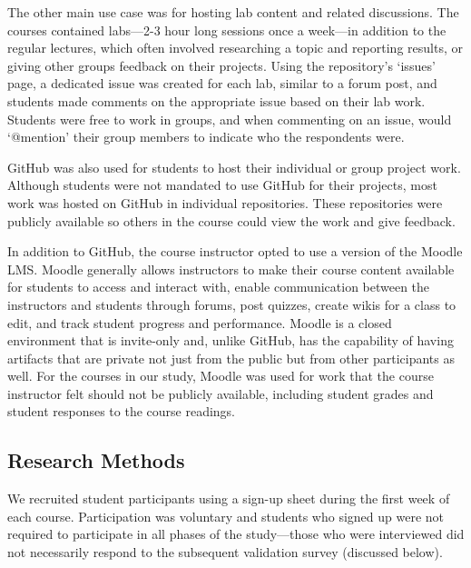The other main use case was for hosting lab content and related discussions. The courses contained labs---2-3 hour long sessions once a week---in addition to the regular lectures, which often involved researching a topic and reporting results, or giving other groups feedback on their projects. Using the repository's `issues' page, a dedicated issue was created for each lab, similar to a forum post, and students made comments on the appropriate issue based on their lab work. Students were free to work in groups, and when commenting on an issue, would `@mention' their group members to indicate who the respondents were.

GitHub was also used for students to host their individual or group project work. Although students were not mandated to use GitHub for their projects, most work was hosted on GitHub in individual repositories. These repositories were publicly available so others in the course could view the work and give feedback.

In addition to GitHub, the course instructor opted to use a version of the Moodle LMS. Moodle generally allows instructors to make their course content available for students to access and interact with, enable communication between the instructors and students through forums, post quizzes, create wikis for a class to edit, and track student progress and performance. Moodle is a closed environment that is invite-only and, unlike GitHub, has the capability of having artifacts that are private not just from the public but from other participants as well. For the courses in our study, Moodle was used for work that the course instructor felt should not be publicly available, including student grades and student responses to the course readings.

\subsection{Research Methods}
We recruited student participants using a sign-up sheet during the first week of each course. Participation was voluntary and students who signed up were not required to participate in all phases of the study---those who were interviewed did not necessarily respond to the subsequent validation survey (discussed below).

